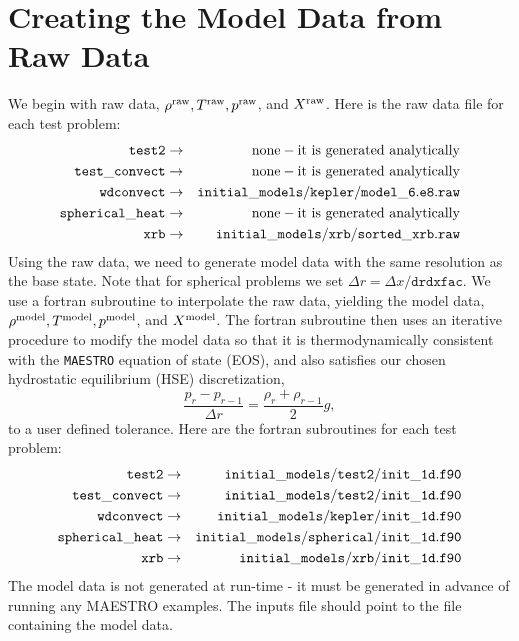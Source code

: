 \section{Creating the Model Data from Raw Data}\label{Sec:Creating the Model Data from Raw Data}

We begin with raw data, $\rho^{\rm raw}, T^{\rm raw}, p^{\rm raw}$, and
$X^{\rm raw}$.  Here is the raw data file for each test problem:
\begin{eqnarray}
{\tt test2} & \rightarrow & \mathrm{none-it~ is~ generated~ analytically} \nonumber \nonumber \\
{\tt test\_convect} & \rightarrow & \mathrm{none-it~ is~ generated~ analytically} \nonumber \nonumber \\
{\tt wdconvect} & \rightarrow & {\tt initial\_models/kepler/model\_6.e8.raw} \nonumber \\
{\tt spherical\_heat} & \rightarrow & \mathrm{none-it~ is~ generated~ analytically} \nonumber \\
{\tt xrb} & \rightarrow & {\tt initial\_models/xrb/sorted\_xrb.raw} \nonumber
\end{eqnarray}
Using the raw data, we need to generate model data with the same
resolution as the base state.  Note that for spherical problems we set
$\Delta r = \Delta x/\mathtt{drdxfac}$.  We use a fortran subroutine
to interpolate the raw data, yielding the model data, $\rho^{\rm model},
T^{\rm model}, p^{\rm model}$, and $X^{\rm model}$.  The fortran subroutine
then uses an iterative procedure to modify the model data so that it
is thermodynamically consistent with the {\tt MAESTRO} equation of
state (EOS), and also satisfies our chosen hydrostatic equilibrium
(HSE) discretization,
\begin{equation}
\frac{p_r - p_{r-1}}{\Delta r} = \frac{\rho_r + \rho_{r-1}}{2}g,\label{HSE Discretization}
\end{equation}
to a user defined tolerance.  Here are the fortran subroutines for each test problem:
\begin{eqnarray}
{\tt test2} & \rightarrow & {\tt initial\_models/test2/init\_1d.f90} \nonumber \\
{\tt test\_convect} & \rightarrow & {\tt initial\_models/test2/init\_1d.f90} \nonumber \\
{\tt wdconvect} & \rightarrow & {\tt initial\_models/kepler/init\_1d.f90} \nonumber \\
{\tt spherical\_heat} & \rightarrow & {\tt initial\_models/spherical/init\_1d.f90} \nonumber \\
{\tt xrb} & \rightarrow & {\tt initial\_models/xrb/init\_1d.f90} \nonumber
\end{eqnarray}
The model data is not generated at run-time - it must be generated in
advance of running any MAESTRO examples.  The inputs file should point
to the file containing the model data.

